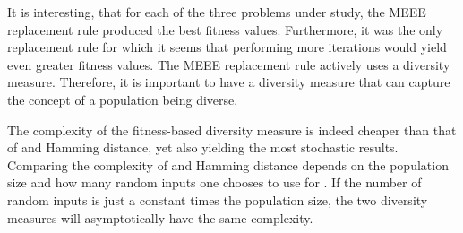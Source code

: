 It is interesting, that for each of the three problems under study, the MEEE replacement rule produced the best fitness values. Furthermore, it was the only replacement rule for which it seems that performing more iterations would yield even greater fitness values. 
The MEEE replacement rule actively uses a diversity measure.
Therefore, it is important to have a diversity measure that can capture the concept of a population being diverse.


The complexity of the fitness-based diversity measure is indeed cheaper than that of \dia{} and Hamming distance, yet also yielding the most stochastic results. Comparing the complexity of \dia{} and Hamming distance depends on the population size and how many random inputs one chooses to use for \dia{}. If the number of random inputs is just a constant times the population size, the two diversity measures will asymptotically have the same complexity.
